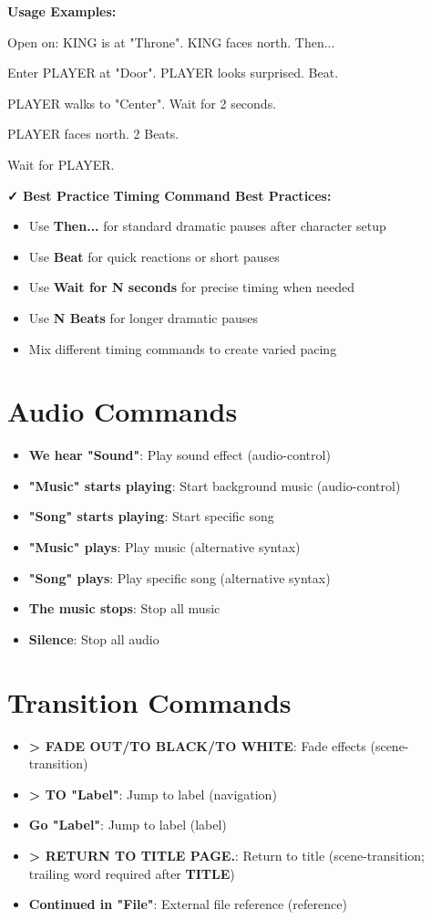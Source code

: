 \documentclass[11pt,letterpaper,oldstylefigures]{memoir}
\newcommand{\stagedir}[1]{#1\par\vspace{1\baselineskip}}
\newenvironment{FountainExample}
  {\begingroup
  \ttfamily\small
   \setlength{\parindent}{0pt}
  \setlength{\parskip}{0.5em}
  \allowdisplaybreaks
  \setlength{\displaywidowpenalty}{0}
  \setlength{\widowpenalty}{0}
  \setlength{\clubpenalty}{0}
  \setlength{\interlinepenalty}{0}
}
  {\endgroup}
\newcommand{\fountain}[1]{\textbf{#1}}
\begin{document}
\textbf{Usage Examples:}
\begin{FountainExample}
\stagedir{Open on: KING is at "Throne". KING faces north. Then...}
\stagedir{Enter PLAYER at "Door". PLAYER looks surprised. Beat.}
\stagedir{PLAYER walks to "Center". Wait for 2 seconds.}
\stagedir{PLAYER faces north. 2 Beats.}
\stagedir{Wait for PLAYER.}
\end{FountainExample}

\textbf{✓ Best Practice}
\textbf{Timing Command Best Practices:}
\begin{itemize}
\item Use \fountain{Then...} for standard dramatic pauses after character setup
\item Use \fountain{Beat} for quick reactions or short pauses
\item Use \fountain{Wait for N seconds} for precise timing when needed
\item Use \fountain{N Beats} for longer dramatic pauses
\item Mix different timing commands to create varied pacing
\end{itemize}


\section{Audio Commands}
\begin{itemize}
\item \fountain{We hear "Sound"}: Play sound effect (\gls{audio-control})
\item \fountain{"Music" starts playing}: Start background music (\gls{audio-control})
\item \fountain{"Song" starts playing}: Start specific song
\item \fountain{"Music" plays}: Play music (alternative syntax)
\item \fountain{"Song" plays}: Play specific song (alternative syntax)
\item \fountain{The music stops}: Stop all music
\item \fountain{Silence}: Stop all audio
\end{itemize}

\section{Transition Commands}
\begin{itemize}
\item \fountain{> FADE OUT/TO BLACK/TO WHITE}: Fade effects (\gls{scene-transition})
\item \fountain{> TO "Label"}: Jump to label (\gls{navigation})
\item \fountain{Go "Label"}: Jump to label (\gls{label})
\item \fountain{> RETURN TO TITLE PAGE.}: Return to title (\gls{scene-transition}; trailing word required after \fountain{TITLE})
\item \fountain{Continued in "File"}: External file reference (\gls{reference})
\end{itemize}
\end{document}
